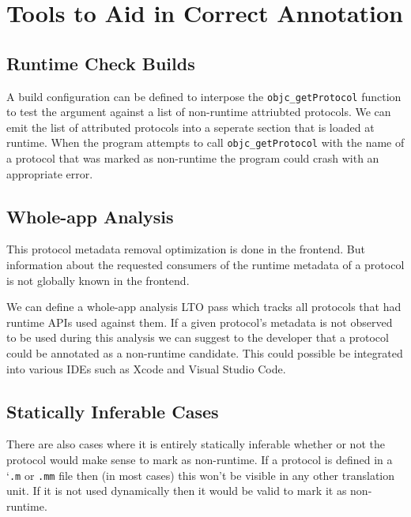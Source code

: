 \documentclass{article}
\begin{document}
\section{Tools to Aid in Correct Annotation}

\subsection{Runtime Check Builds}

A build configuration can be defined to interpose the \verb|objc_getProtocol|
function to test the argument against a list of non-runtime attriubted protocols.
We can emit the list of attributed protocols into a seperate section that is
loaded at runtime. When the program attempts to call \verb|objc_getProtocol|
with the name of a protocol that was marked as non-runtime the program could
crash with an appropriate error.

\subsection{Whole-app Analysis}

This protocol metadata removal optimization is done in the frontend. But
information about the requested consumers of the runtime metadata of a protocol
is not globally known in the frontend.

We can define a whole-app analysis LTO pass which tracks all protocols that had
runtime APIs used against them. If a given protocol's metadata is not observed
to be used during this analysis we can suggest to the developer that a protocol
could be annotated as a non-runtime candidate. This could possible be integrated
into various IDEs such as Xcode and Visual Studio Code.

\subsection{Statically Inferable Cases}

There are also cases where it is entirely statically inferable whether or not
the protocol would make sense to mark as non-runtime. If a protocol is defined
in a `\verb|.m| or \verb|.mm| file then (in most cases) this won't be visible
in any other translation unit. If it is not used dynamically then it would be
valid to mark it as non-runtime.
\end{document}
